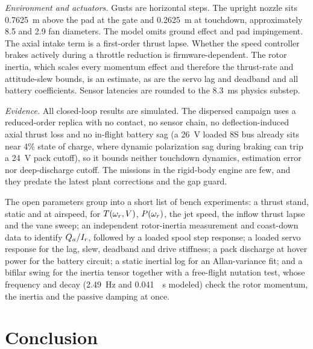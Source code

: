 \documentclass[10pt,letterpaper]{article}
\begin{document}
\textit{Environment and actuators.}
Gusts are horizontal steps. The upright nozzle sits \SI{0.7625}{\metre} above the pad at the gate and \SI{0.2625}{\metre} at touchdown, approximately 8.5 and 2.9 fan diameters. The model omits ground effect and pad impingement.
The axial intake term is a first-order thrust lapse.
Whether the speed controller brakes actively during a throttle reduction is firmware-dependent.
The rotor inertia, which scales every momentum effect and therefore the thrust-rate and attitude-slew bounds, is an estimate, as are the servo lag and deadband and all battery coefficients.
Sensor latencies are rounded to the \SI{8.3}{\milli\second} physics substep.

\textit{Evidence.}
All closed-loop results are simulated.
The dispersed campaign uses a reduced-order replica with no contact, no sensor chain, no deflection-induced axial thrust loss and no in-flight battery sag (a \SI{26}{\volt} loaded 8S bus already sits near 4\% state of charge, where dynamic polarization sag during braking can trip a \SI{24}{\volt} pack cutoff), so it bounds neither touchdown dynamics, estimation error nor deep-discharge cutoff.
The missions in the rigid-body engine are few, and they predate the latest plant corrections and the gap guard.

The open parameters group into a short list of bench experiments:
a thrust stand, static and at airspeed, for $T(\omega_r, V)$, $P(\omega_r)$, the jet speed, the inflow thrust lapse and the vane sweep;
an independent rotor-inertia measurement and coast-down data to identify $Q_a/I_r$, followed by a loaded spool step response;
a loaded servo response for the lag, slew, deadband and drive stiffness;
a pack discharge at hover power for the battery circuit;
a static inertial log for an Allan-variance fit;
and a bifilar swing for the inertia tensor together with a free-flight nutation test, whose frequency and decay (\SI{2.49}{\hertz} and \SI{0.041}{\per\second} modeled) check the rotor momentum, the inertia and the passive damping at once.

\section{Conclusion}
\label{sec:conclusion}
\end{document}

